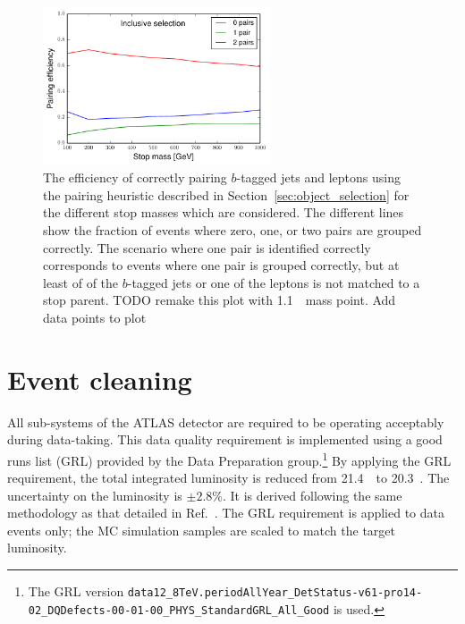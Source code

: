 \begin{figure}[ht]
  \centering
  \includegraphics[width=0.60\textwidth]
    {figs/blstop/PairingEfficiencies/pairing_eff__inclusive.pdf}
  \caption{The efficiency of correctly pairing $b$-tagged jets and leptons
    using the pairing heuristic described in Section~\ref{sec:object_selection}
    for the different stop masses which are considered.
    The different lines show the fraction of events where zero, one, or two
    pairs are grouped correctly.
    The scenario where one pair is identified correctly corresponds to events
    where one pair is grouped correctly, but at least of of the $b$-tagged jets
    or one of the leptons is not matched to a stop parent.
    {\color{red} TODO remake this plot with 1.1~\TeV\ mass point. Add data
    points to plot}
  }
  \label{fig:pairing_eff}
\end{figure}

\section{Event cleaning}
\label{sec:event_cleaning}

All sub-systems of the ATLAS detector are required to be operating acceptably
during data-taking. 
This data quality requirement is implemented using a good runs list (GRL)
provided by the Data Preparation group.\footnote{The GRL version
\texttt{data12\_8TeV.periodAllYear\_DetStatus-v61-pro14-02\_DQDefects-00-01-00\_PHYS\_StandardGRL\_All\_Good}
is used.}
By applying the GRL requirement, the total integrated luminosity is reduced
from 21.4~\ifb\ to 20.3~\ifb.
The uncertainty on the luminosity is $\pm 2.8$\%.
It is derived following the same methodology as that detailed
in Ref.~\cite{Lumi}.
The GRL requirement is applied to data events only; the MC simulation samples
are scaled to match the target luminosity.

